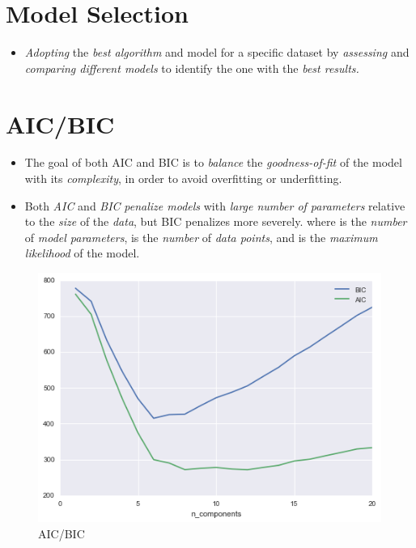 \documentclass[
	number={1},
	title={Machine Learning Fundamentals}
]{cs584notes}
\begin{document}
\section{Model Selection}\label{sec:model-selection}
\begin{itemize}
	\item \emph{Adopting} the \emph{best algorithm} and model for a specific dataset by \emph{assessing} and \emph{comparing different models} to identify the one with the \emph{best results.}
\end{itemize}

\section{AIC/BIC}\label{sec:aic/bic}
\begin{itemize}
	\item The goal of both AIC and BIC is to \emph{balance} the \emph{goodness-of-fit} of the model with its \emph{complexity}, in order to avoid overfitting or underfitting.
	\item Both \emph{AIC} and \emph{BIC} \emph{penalize models} with \emph{large number of parameters} relative to the \emph{size} of the \emph{data}, but BIC penalizes more severely.
	where  is the \emph{number} of \emph{model parameters},  is the \emph{number} of \emph{data points}, and  is the \emph{maximum likelihood} of the model.
\end{itemize}

\begin{figure}[H]
	\centering
	\includegraphics[width=\textwidth]{figures/1/aic_bic}
	\caption{AIC/BIC}
	\label{fig:aic-bic}
\end{figure}
\end{document}
